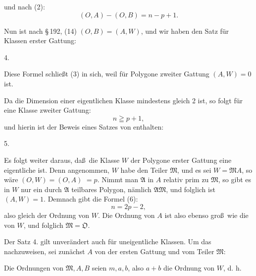 und nach (2):
\[
(O, A) - (O, B) = n - p + 1.
\]

Nun ist nach \S\,192, (14) $(O, B) = (A, W)$, und wir haben
den  Satz für Klassen erster Gattung:

4. 

Diese Formel schlie\ss t (3) in sich, weil für Polygone zweiter
Gattung $(A, W) = 0$ ist.

Da die Dimension einer eigentlichen Klasse mindestens
gleich 2 ist, so folgt für eine Klasse zweiter Gattung:
\[
n \geqq p + 1,
\]
und hierin ist der Beweis eines Satzes von  enthalten:

5. 

Es folgt weiter daraus, da\ss\ die Klasse $W$ der Polygone
erster Gattung eine eigentliche ist. Denn angenommen, $W$ habe
den Teiler $\mathfrak{M}$, und es sei $W = \mathfrak{M} A$, so wäre $(O, W) = (O, A)$
$= p$. Nimmt man $\mathfrak{A}$ in $A$ relativ prim zu $\mathfrak{M}$, so gibt es in $W$ nur
ein durch $\mathfrak{A}$ teilbares Polygon, nämlich $\mathfrak{A}\mathfrak{M}$, und folglich ist
$(A, W) = 1$. Demnach gibt die Formel (6):
\[
n = 2p - 2,
\]
also gleich der Ordnung von $W$. Die Ordnung von $A$ ist also
ebenso gro\ss\ wie die von $W$, und folglich $\mathfrak{M} = \mathfrak{O}$.

Der Satz 4. gilt unverändert auch für uneigentliche Klassen.
Um das nachzuweisen, sei zunächst $A$ von der ersten Gattung
und vom Teiler $\mathfrak{M}$:

Die Ordnungen von $\mathfrak{M}, A, B$ seien $m, a, b$, also $a + b$ die
Ordnung von $W$, d. h.
